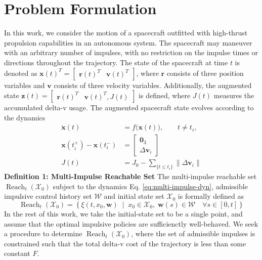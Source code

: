 \documentclass[letterpaper, 10 pt, conference]{ieeeconf}  %
\begin{document}
\section{Problem Formulation}
In this work, we consider the motion of a spacecraft outfitted with high-thrust propulsion capabilities in an autonomous system. The spacecraft may maneuver with an arbitrary number of impulses, with no restriction on the impulse times or directions throughout the trajectory. 
The state of the spacecraft at time $t$ is denoted as $\boldsymbol{x}(t)^T = \begin{bmatrix} \mathbf{r}(t)^T & \mathbf{v}(t)^T\end{bmatrix}$, where $\boldsymbol{r}$ consists of three position variables and $\boldsymbol{v}$ consists of three velocity variables. Additionally, the augmented state $\mathbf{z}(t) = \begin{bmatrix} \mathbf{r}(t)^T & \mathbf{v}(t)^T, J(t)\end{bmatrix}$ is defined, where $J(t)$ measures the accumulated delta-v usage.
The augmented spacecraft state evolves according to the dynamics 
\begin{equation}
\begin{aligned}
   \dot{\mathbf{x}}(t) &= f\bigl(\mathbf{x}(t)\bigr), \qquad t\neq t_i,\\
   \mathbf{x}(t_i^+)-\mathbf{x}(t_i^-)
   &= \begin{bmatrix}
      \mathbf{0}_3\\
      \Delta\mathbf{v}_i
   \end{bmatrix} \\
   J(t) &= J_0 - \sum_{ \{t \leq t_i \} } \| \Delta \mathbf{v}_i \|
\end{aligned}
\label{eq:multi-impulse-dyn}
\end{equation}
\textbf{Definition 1: Multi-Impulse Reachable Set} \newline
The multi-impulse reachable set $\operatorname{Reach}_{t}(\mathcal{X}_{0})$ subject to the dynamics Eq. \eqref{eq:multi-impulse-dyn}, admissible impulsive control history set $\mathcal{W}$ and initial state set $\mathcal{X}_{0}$ is formally defined as 
\begin{equation}
\operatorname{Reach}_{t}(\mathcal{X}_{0})
=
\left\{
\xi(t,x_{0},\mathbf{w})
\;\middle|\;
x_{0}\in\mathcal{X}_{0},\;
\mathbf{w}(s)\in\mathcal{W}
\quad \forall s\in[0,t]
\right\}
\end{equation}
\newline
In the rest of this work, we take the initial-state set to be a single point, and assume that the optimal impulsive policies are sufficienctly well-behaved. We seek a procedure to determine $\operatorname{Reach}_{t}(\mathcal{X}_{0})$, where the set of admissible impulses is constrained such that the total delta-v cost of the trajectory is less than some constant $F$.
\end{document}
